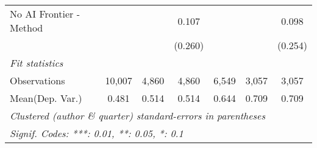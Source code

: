 \begin{tabular}{lcccccc}
   No AI Frontier - Method &               &         & 0.107         &              &              & 0.098\\   
                           &               &         & (0.260)       &              &              & (0.254)\\   
   \midrule
   \emph{Fit statistics}\\
   Observations            & 10,007        & 4,860   & 4,860         & 6,549        & 3,057        & 3,057\\  
Mean(Dep. Var.) & 0.481 & 0.514 & 0.514 & 0.644 & 0.709 & 0.709 \\
   \midrule \midrule
   \multicolumn{7}{l}{\emph{Clustered (author \& quarter) standard-errors in parentheses}}\\
   \multicolumn{7}{l}{\emph{Signif. Codes: ***: 0.01, **: 0.05, *: 0.1}}\\
\end{tabular}
\par\endgroup
